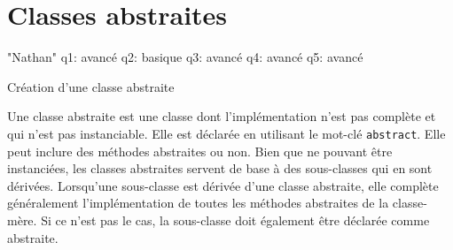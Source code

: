 \section{Classes abstraites}
\begin{note}{"Nathan"}
    q1: avancé
    q2: basique
    q3: avancé
    q4: avancé
    q5: avancé   
\end{note}
\begin{Exercice}[10 minutes]{Création d'une classe abstraite}

Une classe abstraite est une classe dont l'implémentation n'est pas complète et qui n'est pas instanciable. Elle est déclarée en utilisant le mot-clé \lstinline{abstract}. Elle peut inclure des méthodes abstraites ou non. Bien que ne pouvant être instanciées, les classes abstraites servent de base à des sous-classes qui en sont dérivées.
Lorsqu'une sous-classe est dérivée d'une classe abstraite, elle complète généralement l'implémentation de toutes les méthodes abstraites de la classe-mère. Si ce n'est pas le cas, la sous-classe doit également être déclarée comme abstraite.

 


\end{Exercice}
